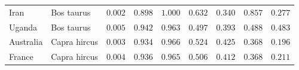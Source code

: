 \documentclass{article}
\providecommand{\DIFaddtex}[1]{{\protect\color{blue}\uwave{#1}}} %
\providecommand{\DIFdeltex}[1]{{\protect\color{red}\sout{#1}}}                      %
\providecommand{\DIFaddFL}[1]{\DIFadd{#1}} %
\providecommand{\DIFdelFL}[1]{\DIFdel{#1}} %
\providecommand{\DIFaddbeginFL}{} %
\providecommand{\DIFaddendFL}{} %
\providecommand{\DIFdelbeginFL}{} %
\providecommand{\DIFdelendFL}{} %
\providecommand{\DIFadd}[1]{\texorpdfstring{\DIFaddtex{#1}}{#1}} %
\providecommand{\DIFdel}[1]{\texorpdfstring{\DIFdeltex{#1}}{}} %
\newcommand{\DIFscaledelfig}{0.5}
\newlength{\DIFdelgraphicswidth} %
\newlength{\DIFdelgraphicsheight} %
\newcommand{\DIFaddincludegraphics}[2][]{{\color{blue}\fbox{\DIFOincludegraphics[#1]{#2}}}} %
\newcommand{\DIFdelincludegraphics}[2][]{%
\sbox{\DIFdelgraphicsbox}{\DIFOincludegraphics[#1]{#2}}%
\settoboxwidth{\DIFdelgraphicswidth}{\DIFdelgraphicsbox} %
\settoboxtotalheight{\DIFdelgraphicsheight}{\DIFdelgraphicsbox} %
\scalebox{\DIFscaledelfig}{%
\parbox[b]{\DIFdelgraphicswidth}{\usebox{\DIFdelgraphicsbox}\\[-\baselineskip] \rule{\DIFdelgraphicswidth}{0em}}\llap{\resizebox{\DIFdelgraphicswidth}{\DIFdelgraphicsheight}{%
\setlength{\unitlength}{\DIFdelgraphicswidth}%
\begin{picture}(1,1)%
\thicklines\linethickness{2pt} %
{\color[rgb]{1,0,0}\put(0,0){\framebox(1,1){}}}%
{\color[rgb]{1,0,0}\put(0,0){\line( 1,1){1}}}%
{\color[rgb]{1,0,0}\put(0,1){\line(1,-1){1}}}%
\end{picture}%
}\hspace*{3pt}}} %
} %
\DeclareRobustCommand{\DIFaddbeginFL}{\DIFOaddbeginFL \let\includegraphics\DIFaddincludegraphics} %
\DeclareRobustCommand{\DIFaddendFL}{\DIFOaddendFL \let\includegraphics\DIFOincludegraphics} %
\DeclareRobustCommand{\DIFdelbeginFL}{\DIFOdelbeginFL \let\includegraphics\DIFdelincludegraphics} %
\DeclareRobustCommand{\DIFdelendFL}{\DIFOaddendFL \let\includegraphics\DIFOincludegraphics} %
\begin{document}
\begin{table}[tb]
\begin{adjustbox}{width=\textwidth}
\begin{tabular}{||l|l|r||r|r||r|r||r|r||}
                Iran & Bos taurus & \DIFdelbeginFL \DIFdelFL{$ 0.002$ }\DIFdelendFL \DIFaddbeginFL \DIFaddFL{$5.6\times 10^{4}$ }\DIFaddendFL & \DIFdelbeginFL \DIFdelFL{$ 0.898$ }\DIFdelendFL \DIFaddbeginFL \DIFaddFL{$ 0.915$ }\DIFaddendFL & $ 1.000$ & $ 0.632$ & \DIFdelbeginFL \DIFdelFL{$ 0.340$ }\DIFdelendFL \DIFaddbeginFL \DIFaddFL{$ 0.358$ }\DIFaddendFL & \DIFdelbeginFL \DIFdelFL{$ 0.857$ }\DIFdelendFL \DIFaddbeginFL \DIFaddFL{$ 0.873$ }\DIFaddendFL & \DIFdelbeginFL \DIFdelFL{$ 0.277$ }\DIFdelendFL \DIFaddbeginFL \DIFaddFL{$ 0.243$ }\DIFaddendFL \\
                Uganda & Bos taurus & \DIFdelbeginFL \DIFdelFL{$ 0.005$ }\DIFdelendFL \DIFaddbeginFL \DIFaddFL{$1.3\times 10^{5}$ }\DIFaddendFL & \DIFdelbeginFL \DIFdelFL{$ 0.942$ }\DIFdelendFL \DIFaddbeginFL \DIFaddFL{$ 0.951$ }\DIFaddendFL & \DIFdelbeginFL \DIFdelFL{$ 0.963$ }\DIFdelendFL \DIFaddbeginFL \DIFaddFL{$ 0.969$ }\DIFaddendFL & \DIFdelbeginFL \DIFdelFL{$ 0.497$ }\DIFdelendFL \DIFaddbeginFL \DIFaddFL{$ 0.495$ }\DIFaddendFL & \DIFdelbeginFL \DIFdelFL{$ 0.393$ }\DIFdelendFL \DIFaddbeginFL \DIFaddFL{$ 0.414$ }\DIFaddendFL & \DIFdelbeginFL \DIFdelFL{$ 0.488$ }\DIFdelendFL \DIFaddbeginFL \DIFaddFL{$ 0.576$ }\DIFaddendFL & \DIFdelbeginFL \DIFdelFL{$ 0.483$ }\DIFdelendFL \DIFaddbeginFL \DIFaddFL{$ 0.415$ }\DIFaddendFL \\
                \rowcolor{LIGHTGREY} Australia & Capra hircus & \DIFdelbeginFL \DIFdelFL{$ 0.003$ }\DIFdelendFL \DIFaddbeginFL \DIFaddFL{$1.7\times 10^{5}$ }\DIFaddendFL & \DIFdelbeginFL \DIFdelFL{$ 0.934$ }\DIFdelendFL \DIFaddbeginFL \DIFaddFL{$ 0.944$ }\DIFaddendFL & \DIFdelbeginFL \DIFdelFL{$ 0.966$ }\DIFdelendFL \DIFaddbeginFL \DIFaddFL{$ 0.971$ }\DIFaddendFL & \DIFdelbeginFL \DIFdelFL{$ 0.524$ }\DIFdelendFL \DIFaddbeginFL \DIFaddFL{$ 0.527$ }\DIFaddendFL & \DIFdelbeginFL \DIFdelFL{$ 0.425$ }\DIFdelendFL \DIFaddbeginFL \DIFaddFL{$ 0.437$ }\DIFaddendFL & $ 0.368$ & \DIFdelbeginFL \DIFdelFL{$ 0.196$ }\DIFdelendFL \DIFaddbeginFL \DIFaddFL{$ 0.177$ }\DIFaddendFL \\
                \rowcolor{LIGHTGREY} France & Capra hircus & \DIFdelbeginFL \DIFdelFL{$ 0.004$ }\DIFdelendFL \DIFaddbeginFL \DIFaddFL{$1.9\times 10^{5}$ }\DIFaddendFL & \DIFdelbeginFL \DIFdelFL{$ 0.936$ }\DIFdelendFL \DIFaddbeginFL \DIFaddFL{$ 0.946$ }\DIFaddendFL & \DIFdelbeginFL \DIFdelFL{$ 0.965$ }\DIFdelendFL \DIFaddbeginFL \DIFaddFL{$ 0.971$ }\DIFaddendFL & \DIFdelbeginFL \DIFdelFL{$ 0.506$ }\DIFdelendFL \DIFaddbeginFL \DIFaddFL{$ 0.508$ }\DIFaddendFL & \DIFdelbeginFL \DIFdelFL{$ 0.412$ }\DIFdelendFL \DIFaddbeginFL \DIFaddFL{$ 0.423$ }\DIFaddendFL & $ 0.368$ & \DIFdelbeginFL \DIFdelFL{$ 0.211$ }\DIFdelendFL \DIFaddbeginFL \DIFaddFL{$ 0.190$ }\DIFaddendFL \\

\end{tabular}
\end{adjustbox}
\end{table}
\end{document}
